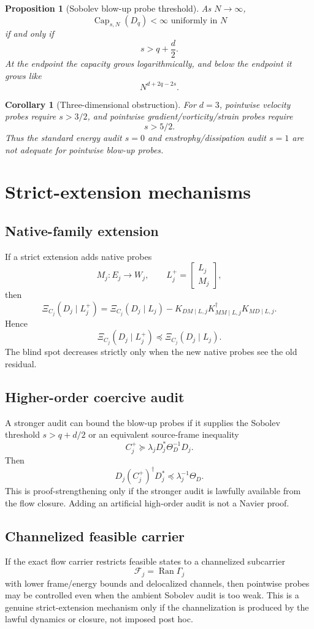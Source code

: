 \documentclass[11pt]{article}
\newtheorem{proposition}{Proposition}
\newtheorem{corollary}{Corollary}
\begin{document}
\begin{proposition}[Sobolev blow-up probe threshold]
As $N\to\infty$,
\[
\operatorname{Cap}_{s,N}(D_q)<\infty \text{ uniformly in }N
\]
if and only if
\[
s>q+\frac d2.
\]
At the endpoint the capacity grows logarithmically, and below the endpoint it grows like
\[
N^{d+2q-2s}.
\]
\end{proposition}

\begin{corollary}[Three-dimensional obstruction]
For $d=3$, pointwise velocity probes require $s>3/2$, and pointwise gradient/vorticity/strain probes require
\[
s>5/2.
\]
Thus the standard energy audit $s=0$ and enstrophy/dissipation audit $s=1$ are not adequate for pointwise blow-up probes.
\end{corollary}

\section{Strict-extension mechanisms}
\subsection{Native-family extension}
If a strict extension adds native probes
\[
M_j:E_j\to W_j,
\qquad
L_j^+=\begin{bmatrix}L_j\\ M_j\end{bmatrix},
\]
then
\[
\Xi_{C_j}(D_j\mid L_j^+)
=
\Xi_{C_j}(D_j\mid L_j)
-
K_{DM\mid L,j}K_{MM\mid L,j}^{\dagger}K_{MD\mid L,j}.
\]
Hence
\[
\Xi_{C_j}(D_j\mid L_j^+)\preceq \Xi_{C_j}(D_j\mid L_j).
\]
The blind spot decreases strictly only when the new native probes see the old residual.

\subsection{Higher-order coercive audit}
A stronger audit can bound the blow-up probes if it supplies the Sobolev threshold $s>q+d/2$ or an equivalent source-frame inequality
\[
C_j^+\succeq \lambda_jD_j^*\Theta_D^{-1}D_j.
\]
Then
\[
D_j(C_j^+)^{\dagger}D_j^*\preceq \lambda_j^{-1}\Theta_D.
\]
This is proof-strengthening only if the stronger audit is lawfully available from the flow closure. Adding an artificial high-order audit is not a Navier proof.

\subsection{Channelized feasible carrier}
If the exact flow carrier restricts feasible states to a channelized subcarrier
\[
\mathcal F_j=\operatorname{Ran}\Gamma_j
\]
with lower frame/energy bounds and delocalized channels, then pointwise probes may be controlled even when the ambient Sobolev audit is too weak. This is a genuine strict-extension mechanism only if the channelization is produced by the lawful dynamics or closure, not imposed post hoc.
\end{document}
